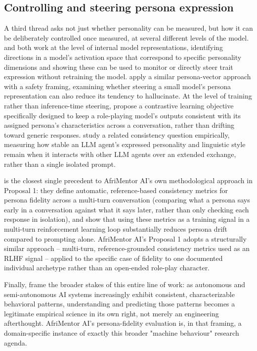 \subsection{Controlling and steering persona expression}

A third thread asks not just whether personality can be measured, but how it can be deliberately controlled once measured, at several different levels of the model. \citet{chen2025personavectors} and \citet{frising2025linear} both work at the level of internal model representations, identifying directions in a model's activation space that correspond to specific personality dimensions and showing these can be used to monitor or directly steer trait expression without retraining the model. \citet{kose2025hallucination} apply a similar persona-vector approach with a safety framing, examining whether steering a small model's persona representation can also reduce its tendency to hallucinate. At the level of training rather than inference-time steering, \citet{ji2025pcl} propose a contrastive learning objective specifically designed to keep a role-playing model's outputs consistent with its assigned persona's characteristics across a conversation, rather than drifting toward generic responses. \citet{frisch2024agents} study a related consistency question empirically, measuring how stable an LLM agent's expressed personality and linguistic style remain when it interacts with other LLM agents over an extended exchange, rather than a single isolated prompt.

\citet{abdulhai2025personas} is the closest single precedent to AfriMentor AI's own methodological approach in Proposal 1: they define automatic, reference-based consistency metrics for persona fidelity across a multi-turn conversation (comparing what a persona says early in a conversation against what it says later, rather than only checking each response in isolation), and show that using these metrics as a training signal in a multi-turn reinforcement learning loop substantially reduces persona drift compared to prompting alone. AfriMentor AI's Proposal 1 adopts a structurally similar approach -- multi-turn, reference-grounded consistency metrics used as an RLHF signal -- applied to the specific case of fidelity to one documented individual archetype rather than an open-ended role-play character.

Finally, \citet{rahwan2019machine} frame the broader stakes of this entire line of work: as autonomous and semi-autonomous AI systems increasingly exhibit consistent, characterizable behavioral patterns, understanding and predicting those patterns becomes a legitimate empirical science in its own right, not merely an engineering afterthought. AfriMentor AI's persona-fidelity evaluation is, in that framing, a domain-specific instance of exactly this broader "machine behaviour" research agenda.

